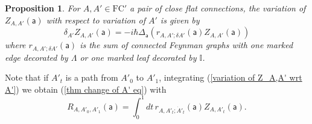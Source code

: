 \documentclass[11pt,a4paper]{amsart}
\theoremstyle{plain} %
\newtheorem{lem}[thm]{Lemma}
\newtheorem{prop}[thm]{Proposition}
\theoremstyle{definition}
\theoremstyle{remark}
\newtheorem{rem}[thm]{Remark}
\newcommand{\sfa}{\mathsf{a}}
\newcommand{\mc}{\mathcal}
\newcommand{\FC}{\mathrm{FC}}
\begin{document}
{\begin{prop}\label{prop: variation of Z wrt A'}
For $A,A'\in\FC'$ a pair of close flat connections, the variation of 
$Z_{A,A'}(\sfa)$ with respect to variation of $A'$ is given by
\begin{equation}\label{variation of Z_A,A' wrt A'}
\delta_{A'} Z_{A,A'}(\sfa)=
-i\hbar
\Delta_\sfa \left(r_{A,A';\delta A'}(\sfa) Z_{A,A'}(\sfa)\right)
\end{equation}
where $r_{A,A';\delta A'}(\sfa)$ is the sum of connected Feynman graphs with one marked edge decorated by $\Lambda$ or one marked leaf decorated by $\mathbb{I}$.
\end{prop}

Note that if $A'_t$ is a path from $A'_0$ to $A'_1$, integrating (\ref{variation of Z_A,A' wrt A'}) we obtain (\ref{thm change of A' eq}) with 
\begin{equation}\label{R in change of Z with A'}
    R_{A,A'_0,A'_1}(\sfa)=\int_0^1 dt\, r_{A,A'_t;\dot{A}'_t}(\sfa) Z_{A,A'_t}(\sfa).
\end{equation}


    

}
\end{document}
